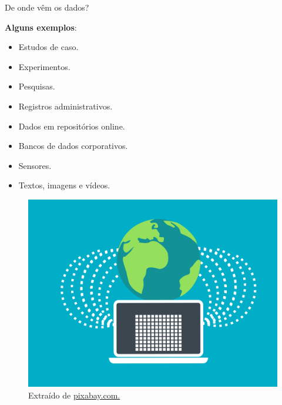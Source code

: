 \documentclass[
  ignorenonframetext,
  serif,
  professionalfont,
  usenames,
  dvipsnames,
  aspectratio = 169]{beamer}
\providecommand{\tightlist}{%
  \setlength{\itemsep}{0pt}\setlength{\parskip}{0pt}}
\renewcommand{\tightlist}{%
  \setlength{\itemsep}{0\baselineskip}
  \setlength{\parskip}{0.25\baselineskip}
}
\def\beginAHalfColumn{\begin{minipage}{0.49\textwidth}}%
\def\endColumns{\end{minipage}}%
\begin{document}
\begin{frame}{De onde vêm os dados?}
\label{de-onde-vuxeam-os-dados}
\beginAHalfColumn

\textbf{Alguns exemplos}:

\begin{itemize}
\tightlist
\item
  Estudos de caso.
\item
  Experimentos.
\item
  Pesquisas.
\item
  Registros administrativos.
\item
  Dados em repositórios online.
\item
  Bancos de dados corporativos.
\item
  Sensores.
\item
  Textos, imagens e vídeos.
\end{itemize}

\endColumns
\beginAHalfColumn

\begin{figure}

{\centering \includegraphics[width=0.9\linewidth]{./img/fontes-dados} 

}

\caption{Extraído de \href{https://cdn.pixabay.com/photo/2022/03/02/09/37/data-7042739_1280.png}{pixabay.com.}}\label{fig:unnamed-chunk-25}
\end{figure}

\endColumns
\end{frame}
\end{document}
